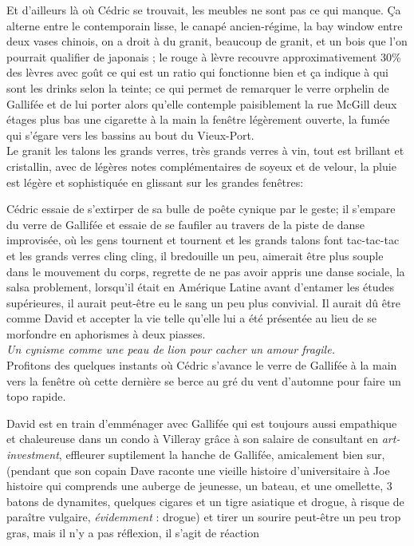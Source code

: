 \documentclass{article}
\begin{document}
Et d'ailleurs là où Cédric se trouvait, les meubles ne sont pas ce qui manque.
Ça alterne entre le contemporain lisse, le canapé ancien-régime, la bay window
entre deux vases chinois, on a droit à du granit, beaucoup de granit, et un bois
que l'on pourrait qualifier de japonais ; le rouge à lèvre recouvre
approximativement 30\% des lèvres avec goût ce qui est un ratio qui fonctionne
bien et ça indique à qui sont les drinks selon la teinte; ce qui permet de
remarquer le verre orphelin de Gallifée et de lui porter alors qu'elle contemple
paisiblement la rue McGill deux étages plus bas une cigarette à la main la
fenêtre légèrement ouverte, la fumée qui s'égare vers les bassins au bout du
Vieux-Port. \\

Le granit les talons les grands verres, très grands verres à vin, tout est
brillant et cristallin, avec de légères notes complémentaires de soyeux et de
velour, la pluie est légère et sophistiquée en glissant sur les grandes
fenêtres:

Cédric essaie
de s'extirper de sa bulle de poête cynique par le geste; il s'empare du
verre de Gallifée et essaie de se faufiler au travers de la piste de danse
improvisée, où les gens tournent et tournent et les grands talons font
tac-tac-tac et les grands verres cling cling, il bredouille un peu, aimerait
être plus souple dans le mouvement du corps, regrette de ne pas avoir appris
une danse sociale, la salsa problement, lorsqu'il était en Amérique Latine
avant d'entamer les études supérieures, il aurait peut-être eu le sang un
peu plus convivial. Il aurait dû être comme David et accepter la vie telle
qu'elle lui a été présentée au lieu de se morfondre en aphorismes à deux
piasses.\\

\emph{Un cynisme comme une peau de lion pour cacher un amour fragile.}\\

Profitons des quelques instants où Cédric s'avance le verre de Gallifée à la
main vers la fenêtre où cette dernière se berce au gré du vent d'automne pour
faire un topo rapide.

David est en train d'emménager avec Gallifée qui est toujours aussi
empathique et chaleureuse dans un condo à Villeray grâce à son salaire de
consultant en \textit{art-investment}, effleurer suptilement la hanche de
Gallifée, amicalement bien sur, (pendant que son copain Dave raconte une
vieille histoire d'universitaire à Joe histoire qui comprends une auberge de
jeunesse, un bateau, et une omellette, 3 batons de dynamites, quelques
cigares et un tigre asiatique et drogue, à risque de paraître vulgaire,
\emph{évidemment} : drogue) et tirer un sourire peut-être un peu trop gras,
mais il n'y a pas réflexion, il s'agit de réaction
\end{document}
